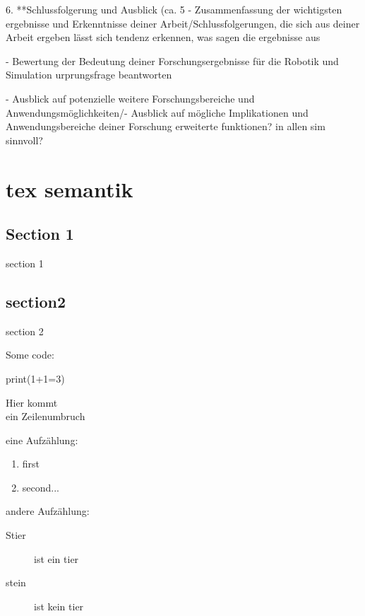 \documentclass[german,version-2020-11]{uzl-thesis}
\begin{document}
%





6. **Schlussfolgerung und Ausblick (ca. 5%
   - Zusammenfassung der wichtigsten ergebnisse und Erkenntnisse deiner Arbeit/Schlussfolgerungen, die sich aus deiner Arbeit ergeben
   lässt sich tendenz erkennen, was sagen die ergebnisse aus

   - Bewertung der Bedeutung deiner Forschungsergebnisse für die Robotik und Simulation
   urprungsfrage beantworten
   
   - Ausblick auf potenzielle weitere Forschungsbereiche und Anwendungsmöglichkeiten/- Ausblick auf mögliche Implikationen und Anwendungsbereiche deiner Forschung
   erweiterte funktionen?
   in allen sim sinnvoll?



\chapter{tex semantik}

\section{Section 1}
section 1


\section{section2}
section 2


Some code:
\begin{Code}
print(1+1=3)
\end{Code}

Hier kommt \\ ein Zeilenumbruch

   eine Aufzählung:

   \begin{enumerate}
   \item 
     first
   \item
     second...
   \end{enumerate}
   
   andere Aufzählung:
   
   \begin{description}
   \item[Stier] 
     ist ein tier
   \item[stein]
     ist kein tier
   \end{description}
   
\end{document}
